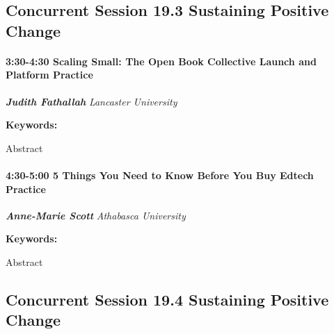 \documentclass[
]{book}
\begin{document}
\hypertarget{concurrent-session-19.3-sustaining-positive-change}{%
\subsection*{Concurrent Session 19.3 \textbar{} Sustaining Positive Change}\label{concurrent-session-19.3-sustaining-positive-change}}

\begin{session}
\hypertarget{scaling-small-the-open-book-collective-launch-and-platform-practice}{%
\paragraph*{\texorpdfstring{3:30-4:30 \textbar{} \textbf{Scaling Small:
The Open Book Collective Launch and Platform} \textbar{}
Practice}{3:30-4:30 \textbar{} Scaling Small: The Open Book Collective Launch and Platform \textbar{} Practice}}\label{scaling-small-the-open-book-collective-launch-and-platform-practice}}

\textbf{\emph{Judith Fathallah}} \textbar{} \emph{Lancaster University}

\textbf{Keywords:}

Abstract
\end{session}

\begin{session}
\hypertarget{things-you-need-to-know-before-you-buy-edtech-practice}{%
\paragraph*{\texorpdfstring{4:30-5:00 \textbar{} \textbf{5 Things You
Need to Know Before You Buy Edtech} \textbar{}
Practice}{4:30-5:00 \textbar{} 5 Things You Need to Know Before You Buy Edtech \textbar{} Practice}}\label{things-you-need-to-know-before-you-buy-edtech-practice}}

\textbf{\emph{Anne-Marie Scott}} \textbar{} \emph{Athabasca University}

\textbf{Keywords:}

Abstract
\end{session}

\hypertarget{concurrent-session-19.4-sustaining-positive-change}{%
\subsection*{Concurrent Session 19.4 \textbar{} Sustaining Positive Change}\label{concurrent-session-19.4-sustaining-positive-change}}
\end{document}
